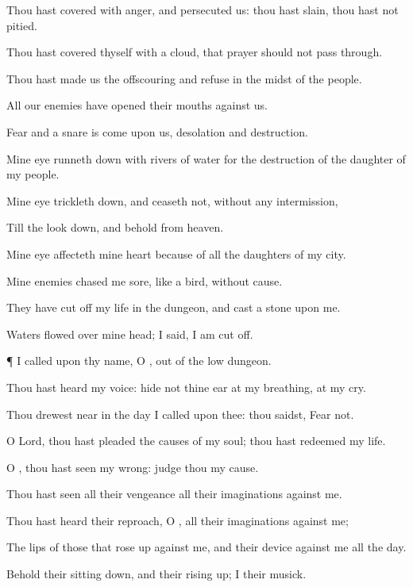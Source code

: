 {Thou hast
covered with
anger, and
persecuted us: thou hast
slain, thou hast not
pitied.

Thou hast
covered thyself with a
cloud, that
{}
prayer should not pass
through.

Thou hast
made us
{} the
offscouring and
refuse in the
midst of the
people.

All our
enemies have
opened their
mouths against us.

Fear and a
snare is come upon us,
desolation and
destruction.

Mine
eye runneth
down with
rivers of
water for the
destruction of the
daughter of my
people.

Mine
eye trickleth
down, and
ceaseth not, without any
intermission,

Till the
{} look
down, and
behold from
heaven.

Mine
eye
affecteth mine
heart because of all the
daughters of my
city.

Mine
enemies
chased me
sore, like a
bird, without
cause.

They have cut
off my
life in the
dungeon, and
cast a
stone upon me.

Waters flowed
over mine
head;
{} I
said, I am cut
off.


\par }{\PP {}¶ I
called upon thy
name, O
{}, out of the
low
dungeon.

Thou hast
heard my
voice:
hide not thine
ear at my
breathing, at my
cry.

Thou drewest
near in the
day
{} I
called upon thee: thou
saidst,
Fear not.

O
Lord, thou hast
pleaded the
causes of my
soul; thou hast
redeemed my
life.

O
{}, thou hast
seen my
wrong:
judge thou my
cause.

Thou hast
seen all their
vengeance
{} all their
imaginations against me.

Thou hast
heard their
reproach, O
{},
{} all their
imaginations against me;

The
lips of those that rose
up against me, and their
device against me all the
day.

Behold their sitting
down, and their rising
up; I
{} their
musick.


}
